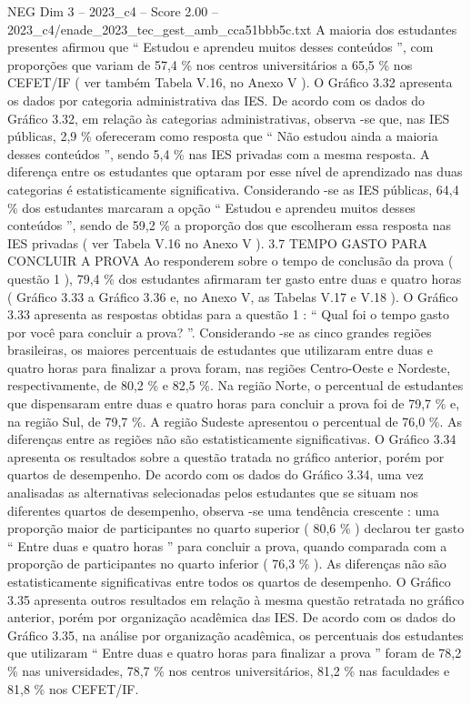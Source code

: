 \begin{textsample}{NEG Dim 3 – 2023\_c4 – Score 2.00 – 2023\_c4/enade\_2023\_tec\_gest\_amb\_cca51bbb5c.txt}
A maioria dos estudantes presentes afirmou que “ Estudou e aprendeu muitos desses conteúdos ”, com proporções que variam de 57,4 \% nos centros universitários a 65,5 \% nos CEFET/IF ( ver também Tabela V.16, no Anexo V ).
O Gráfico 3.32 apresenta os dados por categoria administrativa das IES.
De acordo com os dados do Gráfico 3.32, em relação às categorias administrativas, observa -se que, nas IES públicas, 2,9 \% ofereceram como resposta que “ Não estudou ainda a maioria desses conteúdos ”, sendo 5,4 \% nas IES privadas com a mesma resposta.
A diferença entre os estudantes que optaram por esse nível de aprendizado nas duas categorias é estatisticamente significativa.
Considerando -se as IES públicas, 64,4 \% dos estudantes marcaram a opção “ Estudou e aprendeu muitos desses conteúdos ”, sendo de 59,2 \% a proporção dos que escolheram essa resposta nas IES privadas ( ver Tabela V.16 no Anexo V ). 3.7 TEMPO GASTO PARA CONCLUIR A PROVA Ao responderem sobre o tempo de conclusão da prova ( questão 1 ), 79,4 \% dos estudantes afirmaram ter gasto entre duas e quatro horas ( Gráfico 3.33 a Gráfico 3.36 e, no Anexo V, as Tabelas V.17 e V.18 ).
O Gráfico 3.33 apresenta as respostas obtidas para a questão 1 : “ Qual foi o tempo gasto por você para concluir a prova? ”.
Considerando -se as cinco grandes regiões brasileiras, os maiores percentuais de estudantes que utilizaram entre duas e quatro horas para finalizar a prova foram, nas regiões Centro-Oeste e Nordeste, respectivamente, de 80,2 \% e 82,5 \%.
Na região Norte, o percentual de estudantes que dispensaram entre duas e quatro horas para concluir a prova foi de 79,7 \% e, na região Sul, de 79,7 \%.
A região Sudeste apresentou o percentual de 76,0 \%.
As diferenças entre as regiões não são estatisticamente significativas.
O Gráfico 3.34 apresenta os resultados sobre a questão tratada no gráfico anterior, porém por quartos de desempenho.
De acordo com os dados do Gráfico 3.34, uma vez analisadas as alternativas selecionadas pelos estudantes que se situam nos diferentes quartos de desempenho, observa -se uma tendência crescente : uma proporção maior de participantes no quarto superior ( 80,6 \% ) declarou ter gasto “ Entre duas e quatro horas ” para concluir a prova, quando comparada com a proporção de participantes no quarto inferior ( 76,3 \% ).
As diferenças não são estatisticamente significativas entre todos os quartos de desempenho.
O Gráfico 3.35 apresenta outros resultados em relação à mesma questão retratada no gráfico anterior, porém por organização acadêmica das IES.
De acordo com os dados do Gráfico 3.35, na análise por organização acadêmica, os percentuais dos estudantes que utilizaram “ Entre duas e quatro horas para finalizar a prova ” foram de 78,2 \% nas universidades, 78,7 \% nos centros universitários, 81,2 \% nas faculdades e 81,8 \% nos CEFET/IF.

\end{textsample}
